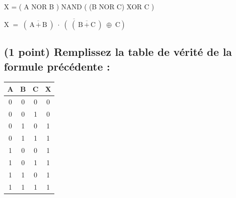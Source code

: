 \documentclass[11pt,a4paper]{article}
\begin{document}
\bigskip

 X  =  ( A NOR B )  NAND  ( (B NOR C) XOR C )

\bigskip
\bigskip

$ \text{X} \; = \; \overline{ ( \overline{\text{A} \, + \, \text{B}} ) \; \cdot \; ( \; ( \overline{\text{B} \, + \, \text{C}} ) \; \oplus \; \text{C} ) } $

\bigskip

\bigskip


\subsection{(1 point) Remplissez la table de vérité de la formule précédente : }

\medskip

\begin{center}
\begin{tabular}{|c|c|c||c|}
\hline
\cellcolor{black!15} \textbf{A} & \cellcolor{black!15} \textbf{B} & \cellcolor{black!15} \textbf{C} &  \cellcolor{black!15} \textbf{X} \\
\hline
\hline
0 & 0 & 0  &  \cellcolor{black!15} 0 \\ \hline
0 & 0 & 1  &  \cellcolor{black!15} 0 \\ \hline
0 & 1 & 0  &  \cellcolor{black!15} 1 \\ \hline
0 & 1 & 1  &  \cellcolor{black!15} 1 \\ \hline
1 & 0 & 0  &  \cellcolor{black!15} 1 \\ \hline
1 & 0 & 1  &  \cellcolor{black!15} 1 \\ \hline
1 & 1 & 0  &  \cellcolor{black!15} 1 \\ \hline
1 & 1 & 1  &  \cellcolor{black!15} 1 \\ \hline
\end{tabular}
\end{center}
\end{document}
